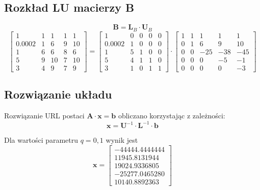 \documentclass[a4paper]{article}
\begin{document}
\subsection{Rozkład LU macierzy B}
$$ \textbf{B} = \textbf{L}_B \cdot \textbf{U}_B$$
$$
\left[
\begin{array}{ccccc}
1&1&1&1&1\\ 
0.0002&1&6&9&10\\ 
1&6&6&8&6\\ 
5&9&10&7&10\\ 
3&4&9&7&9
\end{array}
\right]
=
\left[
\begin{array}{ccccc}
1&0&0&0&0\\ 
0.0002&1&0&0&0\\ 
1&5&1&0&0\\ 
5&4&1&1&0\\ 
3&1&0&1&1
\end{array}
\right]
\cdot
\left[
\begin{array}{ccccc}
1&1&1&1&1\\ 
0&1&6&9&10\\ 
0&0&-25&-38&-45\\ 
0&0&0&-5&-1\\ 
0&0&0&0&-3
\end{array}
\right]
$$
\subsection{Rozwiązanie układu}
Rozwiązanie URL postaci $\textbf{A} \cdot \textbf{x} = \textbf{b}$ obliczano korzystając z zależności: 
$$
\textbf{x} = \textbf{U}^{-1} \cdot \textbf{L}^{-1} \cdot \textbf{b}
$$

Dla wartości parametru $q = 0,1$ wynik jest
$$
\textbf{x} =
\left[
\begin{array}{c}
-44444.4444444\\ 
11945.8131944\\ 
19024.9336805\\ 
-25277.0465280\\ 
10140.8892363
\end{array}
\right]
$$
\end{document}
